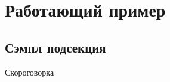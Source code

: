 \documentclass[12pt,aspectratio=43,svgnames]{beamer}
\begin{document}
 \maketitle

\begin{frame} 
	\tableofcontents
\end{frame}

\section{Работающий пример}

\subsection{Сэмпл подсекция}

\begin{frame} 
	Скороговорка
\end{frame}

\begin{frame} 
	\cite{petersGT,mszGT,brusselsEVO,derivativeEVO}
\end{frame}

\begin{frame} \scriptsize
	
	
\end{frame}
\end{document}
